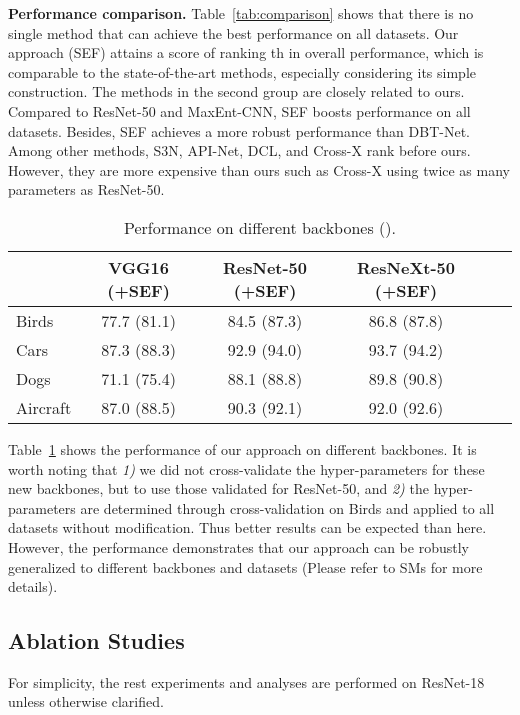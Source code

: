 \documentclass[journal]{IEEEtran}
\begin{document}
\textbf{Performance comparison.} Table~\ref{tab:comparison} shows that there is no single method that can achieve the best performance on all datasets. Our approach (SEF) attains a score of  ranking th in overall performance, which is comparable to the state-of-the-art methods, especially considering its simple construction. The methods in the second group are closely related to ours. Compared to ResNet-50 and MaxEnt-CNN, SEF boosts performance on all datasets. Besides, SEF achieves a more robust performance than DBT-Net. 
Among other methods, S3N, API-Net, DCL, and Cross-X rank before ours. However, they are more expensive than ours such as Cross-X using twice as many parameters as ResNet-50.

\begin{table}[h]
    \centering
    \caption{Performance on different backbones ().}
    \begin{threeparttable}
    \begin{tabular}[width=\linewidth]{lcccc|c}
        \toprule
            & VGG16 (+SEF) & ResNet-50 (+SEF) & ResNeXt-50 (+SEF) \\
        \midrule
        Birds   &77.7 (81.1)      &84.5 (87.3)          &86.8 (87.8) \\
        Cars    &87.3 (88.3)      &92.9 (94.0)          &93.7 (94.2)\\
        Dogs    &71.1 (75.4)      &88.1 (88.8)          &89.8 (90.8)\\
        Aircraft &87.0 (88.5)     &90.3 (92.1)          &92.0 (92.6)\\
        \bottomrule
    \end{tabular}
    \end{threeparttable}
    \label{tab:backbones}
\end{table}

Table~\ref{tab:backbones} shows the performance of our approach on different backbones. It is worth noting that {\it 1)} we did not cross-validate the hyper-parameters for these new backbones, but to use those validated for ResNet-50, and {\it 2)} the hyper-parameters are determined through cross-validation on Birds and applied to all datasets without modification. Thus better results can be expected than here. However, the performance demonstrates that our approach can be robustly generalized to different backbones and datasets (Please refer to SMs for more details).






\subsection{Ablation Studies}
\label{sec:ablation}
For simplicity, the rest experiments and analyses are performed on ResNet-18 unless otherwise clarified.
\end{document}
